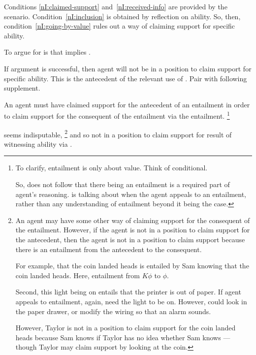 \begin{note}
  Conditions \ref{nI:claimed-support} and~\ref{nI:received-info} are provided by the scenario.
  Condition~\ref{nI:inclusion} is obtained by reflection on ability.
  So, then, condition~\ref{nI:going-by-value} rules out a way of claiming support for specific ability.

  To argue for is that \AR{} implies \RBV{}.
\end{note}

\begin{note}
  If argument is successful, then agent will not be in a position to claim support for specific ability.
  This is the antecedent of the relevant use of \aben{}.
  Pair \nI{} with following supplement.

  \begin{proposition}[\nIm{}]
    An agent must have claimed support for the antecedent of an entailment in order to claim support for the consequent of the entailment via the entailment.\nolinebreak
    \footnote{To clarify, entailment is only about value.
      Think of conditional.

      So, does not follow that there being an entailment is a required part of agent's reasoning.
      \nIm{} is talking about when the agent appeals to an entailment, rather than any understanding of entailment beyond it being the case.
    }
  \end{proposition}
  \nIm{} seems indisputable,\nolinebreak
  \footnote{
    An agent may have some other way of claiming support for the consequent of the entailment.
    However, if the agent is not in a position to claim support for the antecedent, then the agent is not in a position to claim support because there is an entailment from the antecedent to the consequent.\nolinebreak

    For example, that the coin landed heads is entailed by Sam knowing that the coin landed heads.
    Here, entailment from \(K\phi\) to \(\phi\).

    Second, this light being on entails that the printer is out of paper.
    If agent appeals to entailment, again, need the light to be on.
    However, could look in the paper drawer, or modify the wiring so that an alarm sounds.

    However, Taylor is not in a position to claim support for the coin landed heads because Sam knows if Taylor has no idea whether Sam knows --- though Taylor may claim support by looking at the coin.
  }
  and so not in a position to claim support for result of witnessing ability via \AR{}.
\end{note}

